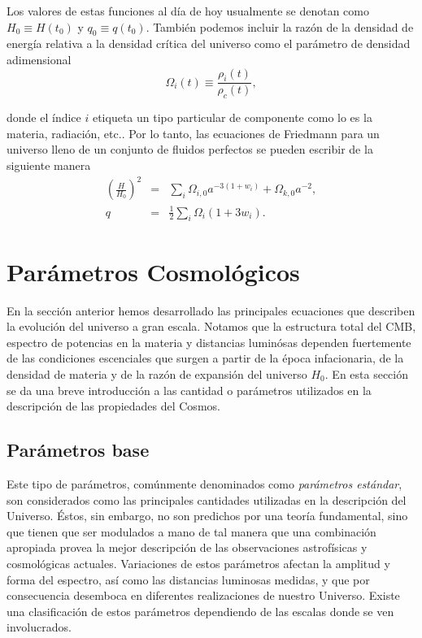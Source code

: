 \documentclass[10.5pt,prb,
               showpacs,            %
               preprintnumbers,     %
               aps,                 %
               prl,          	    %
               letterpaper,             %
               superscriptaddress,      %
               nofootinbib,         %
               tightenlines,        %
               floats,floatfix      %
               ,usenatbib]{revtex4-1}%
\def\beq{\begin{equation}}
\def\eeq{\end{equation}}
\begin{document}
Los valores de estas funciones al d\'ia de hoy usualmente se denotan como $H_0\equiv H(t_0)$
y $q_0 \equiv q(t_0)$.
Tambi\'en podemos incluir la raz\'on de la densidad de energ\'ia relativa a la densidad cr\'itica del universo
como el par\'ametro de densidad adimensional
%
	\beq
		\Omega_i(t) \equiv \frac{\rho_i(t)}{\rho_c(t)},
	\eeq

\noindent
donde el \'indice $i$ etiqueta un tipo particular de componente como lo es la materia, radiaci\'on, etc.. 
Por lo tanto,  las ecuaciones de Friedmann para un universo
lleno de un conjunto de fluidos perfectos se pueden escribir de la siguiente manera
%
	\begin{eqnarray}
		\left(\frac{H}{H_0} \right)^2 &=& \sum_i \Omega_{i,0}a^{-3(1+w_i)} + \Omega_{k,0}a^{-2},\\
		q &=& \frac{1}{2} \sum_i \Omega_i (1+3w_i).
	\end{eqnarray}



\section{Par\'ametros Cosmol\'ogicos}


En la secci\'on anterior hemos desarrollado las principales ecuaciones que describen la evoluci\'on del
universo a gran escala. Notamos que la estructura total del CMB, espectro de potencias en la materia
y distancias lumin\'osas dependen fuertemente de las condiciones escenciales que surgen a partir de la \'epoca
infacionaria, de la densidad de materia y de la raz\'on de expansi\'on del universo $H_0$. 
En esta secci\'on se da una breve introducci\'on a las cantidad o par\'ametros utilizados en la descripci\'on de las propiedades
del Cosmos.


\subsection{Par\'ametros base}


Este tipo de par\'ametros, com\'unmente  denominados como \textit{par\'ametros est\'andar}, son considerados
como las principales cantidades utilizadas en la descripci\'on del Universo.
\'Estos, sin embargo, no son predichos por una teor\'ia fundamental, sino que tienen que ser modulados
a mano de tal manera que una combinaci\'on apropiada provea la mejor descripci\'on de las observaciones
astrof\'isicas y cosmol\'ogicas  actuales. Variaciones de estos par\'ametros afectan la amplitud y forma del espectro, as\'i como
las distancias luminosas medidas, y que por consecuencia desemboca en diferentes realizaciones de nuestro 
Universo. Existe una clasificaci\'on de estos par\'ametros dependiendo de las escalas donde se ven involucrados.
\end{document}
